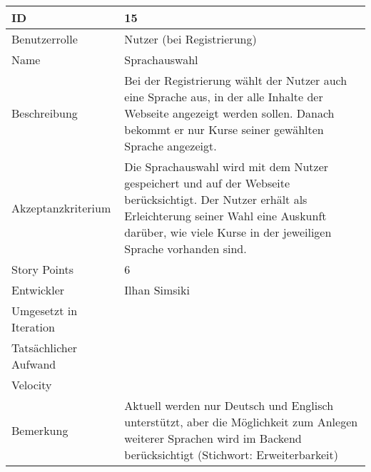 \begin{tabularx}{\textwidth}{|p{}|X|}
	\hline
	ID & 15\\
	\hline
	Benutzerrolle & Nutzer (bei Registrierung)\\
	\hline
	Name & Sprachauswahl\\
	\hline
	Beschreibung & Bei der Registrierung wählt der Nutzer auch eine Sprache aus, in der alle Inhalte der Webseite angezeigt werden sollen. Danach bekommt er nur Kurse seiner gewählten Sprache angezeigt.\\
	\hline
	Akzeptanzkriterium & Die Sprachauswahl wird mit dem Nutzer gespeichert und auf der Webseite berücksichtigt. Der Nutzer erhält als  Erleichterung seiner Wahl eine Auskunft darüber, wie viele Kurse in der jeweiligen Sprache vorhanden sind.\\
	\hline
	Story Points & 6\\
	\hline
	Entwickler & Ilhan Simsiki\\
	\hline
	Umgesetzt in Iteration & \\ 
	\hline
	Tatsächlicher Aufwand & \\
	\hline
	Velocity & \\
	\hline
	Bemerkung & Aktuell werden nur Deutsch und Englisch unterstützt, aber die Möglichkeit zum Anlegen weiterer Sprachen wird im Backend berücksichtigt (Stichwort: Erweiterbarkeit)\\
	\hline
\end{tabularx}
\vspace{20pt}
